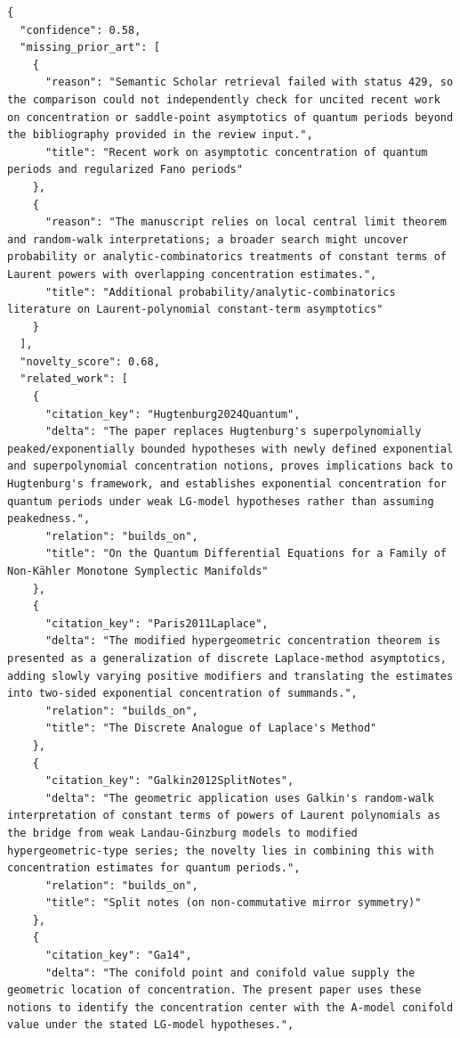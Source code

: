 \documentclass[11pt]{article}
\begin{document}
\begin{verbatim}
{
  "confidence": 0.58,
  "missing_prior_art": [
    {
      "reason": "Semantic Scholar retrieval failed with status 429, so the comparison could not independently check for uncited recent work on concentration or saddle-point asymptotics of quantum periods beyond the bibliography provided in the review input.",
      "title": "Recent work on asymptotic concentration of quantum periods and regularized Fano periods"
    },
    {
      "reason": "The manuscript relies on local central limit theorem and random-walk interpretations; a broader search might uncover probability or analytic-combinatorics treatments of constant terms of Laurent powers with overlapping concentration estimates.",
      "title": "Additional probability/analytic-combinatorics literature on Laurent-polynomial constant-term asymptotics"
    }
  ],
  "novelty_score": 0.68,
  "related_work": [
    {
      "citation_key": "Hugtenburg2024Quantum",
      "delta": "The paper replaces Hugtenburg's superpolynomially peaked/exponentially bounded hypotheses with newly defined exponential and superpolynomial concentration notions, proves implications back to Hugtenburg's framework, and establishes exponential concentration for quantum periods under weak LG-model hypotheses rather than assuming peakedness.",
      "relation": "builds_on",
      "title": "On the Quantum Differential Equations for a Family of Non-Kähler Monotone Symplectic Manifolds"
    },
    {
      "citation_key": "Paris2011Laplace",
      "delta": "The modified hypergeometric concentration theorem is presented as a generalization of discrete Laplace-method asymptotics, adding slowly varying positive modifiers and translating the estimates into two-sided exponential concentration of summands.",
      "relation": "builds_on",
      "title": "The Discrete Analogue of Laplace's Method"
    },
    {
      "citation_key": "Galkin2012SplitNotes",
      "delta": "The geometric application uses Galkin's random-walk interpretation of constant terms of powers of Laurent polynomials as the bridge from weak Landau-Ginzburg models to modified hypergeometric-type series; the novelty lies in combining this with concentration estimates for quantum periods.",
      "relation": "builds_on",
      "title": "Split notes (on non-commutative mirror symmetry)"
    },
    {
      "citation_key": "Ga14",
      "delta": "The conifold point and conifold value supply the geometric location of concentration. The present paper uses these notions to identify the concentration center with the A-model conifold value under the stated LG-model hypotheses.",

\end{verbatim}
\end{document}
